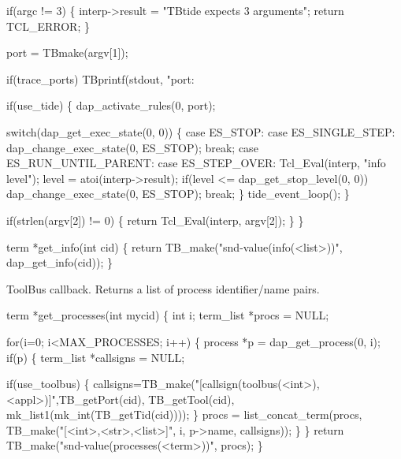   if(argc != 3) \{
    interp->result = "TBtide expects 3 arguments";
    return TCL_ERROR;
  \}

  port = TBmake(argv[1]);

  if(trace_ports)
    TBprintf(stdout, "port: %

  if(use_tide) \{
    dap_activate_rules(0, port);

    switch(dap_get_exec_state(0, 0)) \{
      case ES_STOP:             
      case ES_SINGLE_STEP:      dap_change_exec_state(0, ES_STOP);
                                break;
      case ES_RUN_UNTIL_PARENT:
      case ES_STEP_OVER:        Tcl_Eval(interp, "info level");
                                level = atoi(interp->result);
                                if(level <= dap_get_stop_level(0, 0))
                                  dap_change_exec_state(0, ES_STOP);
                                break;
    \}
    tide_event_loop();
  \}

  if(strlen(argv[2]) != 0) \{
    return Tcl_Eval(interp, argv[2]);
  \}
\}
\nwendcode{}\nwdocspar



\nwenddocs{}\endmoddef\let\nwnotused=\nwoutput{}
term *get_info(int cid)
\{
  return TB_make("snd-value(info(<list>))", dap_get_info(cid));
\}
\nwendcode{}\nwdocspar


ToolBus callback. Returns a list of process identifier/name pairs.

\nwenddocs{}\endmoddef\let\nwnotused=\nwoutput{}
term *get_processes(int mycid)
\{
  int i;
  term_list *procs = NULL;

  for(i=0; i<MAX_PROCESSES; i++) \{
    process *p = dap_get_process(0, i);
    if(p) \{
      term_list *callsigns = NULL;

      if(use_toolbus) \{
        callsigns=TB_make("[callsign(toolbus(<int>),<appl>)]",TB_getPort(cid),
                 TB_getTool(cid), mk_list1(mk_int(TB_getTid(cid))));
      \}
      procs = list_concat_term(procs, TB_make("[<int>,<str>,<list>]", 
                                                i, p->name, callsigns));
    \}
  \}
  return TB_make("snd-value(processes(<term>))", procs);
\}
\nwendcode{}\nwdocspar

